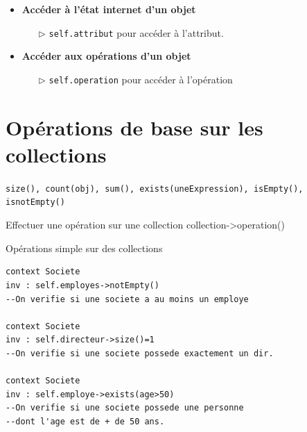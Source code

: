 \documentclass[16pt]{report}
\begin{document}
\begin{multicols*}{2}
        \begin{itemize}
            \item \textbf{Accéder à l'état internet d'un objet}  
            \begin{itemize}
                \item[$\rhd$] \texttt{self.attribut} pour accéder à l'attribut.  
            \end{itemize}
            \item \textbf{Accéder aux opérations d'un objet}   
            \begin{itemize}
                \item[$\rhd$] \texttt{self.operation} pour accéder à l'opération  
            \end{itemize}
       \end{itemize}

       \section{Opérations de base sur les collections}
       \texttt{size(), count(obj), sum(), exists(uneExpression), isEmpty(), isnotEmpty()}  
       \begin{Syntaxe}{Effectuer une opération sur une collection}{}
           collection->operation()
       \end{Syntaxe}
       \begin{EExample}{Opérations simple sur des collections}{}
           \begin{lstlisting}           
context Societe
inv : self.employes->notEmpty() 
--On verifie si une societe a au moins un employe

context Societe 
inv : self.directeur->size()=1  
--On verifie si une societe possede exactement un dir.

context Societe
inv : self.employe->exists(age>50) 
--On verifie si une societe possede une personne 
--dont l'age est de + de 50 ans. 


\end{lstlisting}
\end{EExample}
\end{multicols*}
\end{document}

